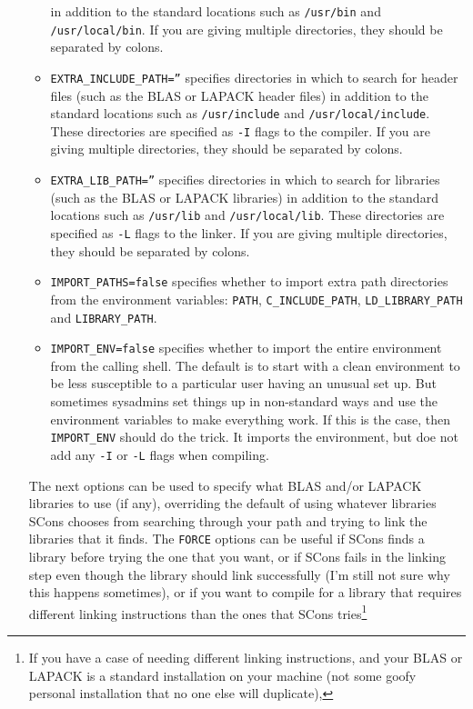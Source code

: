 \documentclass[twoside,letterpaper,11pt]{article}
\begin{document}
\begin{enumerate}
\begin{itemize}
in addition to the standard locations such as \texttt{/usr/bin} and \texttt{/usr/local/bin}.
If you are giving multiple directories, they should be separated by colons.
\item \texttt{EXTRA\_INCLUDE\_PATH=''} specifies directories in which to search for header files
(such as the BLAS or LAPACK header files)
in addition to the standard locations such as \texttt{/usr/include} and \texttt{/usr/local/include}.
These directories are specified as \texttt{-I} flags to the compiler.
If you are giving multiple directories, they should be separated by colons.
\item \texttt{EXTRA\_LIB\_PATH=''} specifies directories in which to search for libraries
(such as the BLAS or LAPACK libraries)
in addition to the standard locations such as \texttt{/usr/lib} and \texttt{/usr/local/lib}.  
These directories are specified as \texttt{-L} flags to the linker.
If you are giving multiple directories, they should be separated by colons.
\item \texttt{IMPORT\_PATHS=false} specifies whether to import extra path directories from the environment variables: 
\texttt{PATH}, \texttt{C\_INCLUDE\_PATH}, \texttt{LD\_LIBRARY\_PATH} and \texttt{LIBRARY\_PATH}.
\item \texttt{IMPORT\_ENV=false} specifies whether to import the entire environment from the calling shell.
The default
is to start with a clean environment to be less susceptible to a particular user having an unusual set up.  But sometimes sysadmins set things up in non-standard ways and use
the environment variables to make everything work.  If this is the case, then 
\texttt{IMPORT\_ENV} should do the trick.  It imports the environment, but doe not add any
\texttt{-I} or \texttt{-L} flags when compiling.
\end{itemize}
The next options can be used to specify what BLAS and/or LAPACK libraries to use (if any),
overriding the default of using whatever libraries SCons chooses from searching through your path
and trying to link the libraries that it finds.  The \texttt{FORCE} options can be useful if SCons finds
a library before trying the one that you want, or if SCons fails in the linking step even though
the library should link successfully (I'm still not sure why this happens sometimes), or if
you want to compile for a library that requires different linking instructions than the 
ones that SCons tries\footnote{
If you have a case of needing different linking instructions, and your BLAS or LAPACK is a standard
installation on your machine (not some goofy personal installation that no one else will duplicate),
}
\end{enumerate}
\end{document}
